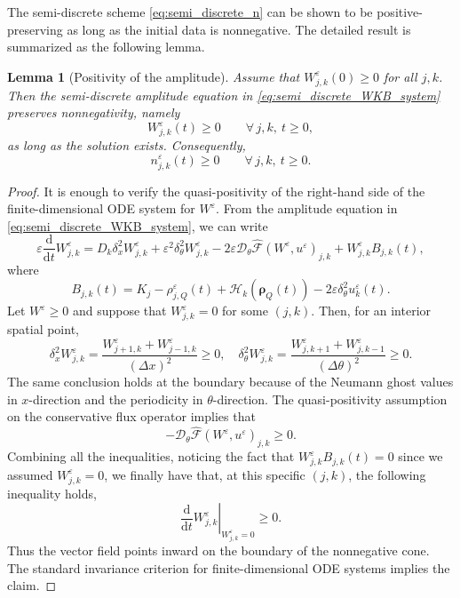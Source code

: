 \documentclass[11pt]{article}
\newtheorem{lemma}{Lemma}[section]
\begin{document}
The semi-discrete scheme \eqref{eq:semi_discrete_n} can be shown to be positive-preserving 
as long as the initial data is nonnegative. 
The detailed result is summarized as the following lemma. 

\begin{lemma}[Positivity of the amplitude]
\label{lem:positivity_W}
Assume that \(W_{j,k}^\varepsilon(0)\ge0\) for all \(j,k\). Then the
semi-discrete amplitude equation in \eqref{eq:semi_discrete_WKB_system}
preserves nonnegativity, namely
\[
    W_{j,k}^\varepsilon(t)\ge0
    \qquad
    \forall\,j,k,\ t\ge0,
\]
as long as the solution exists. Consequently,
\[
    n_{j,k}^\varepsilon(t)\ge0
    \qquad
    \forall\,j,k,\ t\ge0 .
\]
\end{lemma}

\begin{proof}
It is enough to verify the quasi-positivity of the right-hand side of the
finite-dimensional ODE system for \(W^\varepsilon\). From the amplitude
equation in \eqref{eq:semi_discrete_WKB_system}, we can write
\[
\varepsilon \frac{\mathrm d}{\mathrm dt}W_{j,k}^\varepsilon
=
D_k\delta_x^2W_{j,k}^\varepsilon
+
\varepsilon^2\delta_\theta^2W_{j,k}^\varepsilon
-
2\varepsilon
\mathcal D_\theta\widehat{\mathcal F}(W^\varepsilon,u^\varepsilon)_{j,k}
+
W_{j,k}^\varepsilon B_{j,k}(t),
\]
where
\[
B_{j,k}(t)
=
K_j-\rho_{j,Q}^\varepsilon(t)
+\mathcal H_k(\boldsymbol\rho_Q(t))
-2\varepsilon\delta_\theta^2u_k^\varepsilon(t).
\]
Let \(W^\varepsilon\ge0\) and suppose that
\(W_{j,k}^\varepsilon=0\) for some \((j,k)\). Then, for an interior spatial
point,
\[
\delta_x^2W_{j,k}^\varepsilon
=
\frac{W_{j+1,k}^\varepsilon+W_{j-1,k}^\varepsilon}{(\Delta x)^2}
\ge0, 
\quad 
\delta_\theta^2W_{j,k}^\varepsilon
=
\frac{W_{j,k+1}^\varepsilon+W_{j,k-1}^\varepsilon}{(\Delta\theta)^2}
\ge0 .
\]
The same conclusion holds at the boundary because of the Neumann ghost
values in $x$-direction and the periodicity in \(\theta\)-direction. 
The quasi-positivity assumption on the conservative flux operator implies that 
\[
    -
    \mathcal D_\theta\widehat{\mathcal F}(W^\varepsilon,u^\varepsilon)_{j,k}
    \ge0 .
\]
Combining all the inequalities, noticing the fact that 
\(
    W_{j,k}^\varepsilon B_{j,k}(t)=0 
\)
since we assumed $W_{j,k}^\varepsilon=0$, 
we finally have that, at this specific $(j,k)$, the following inequality holds, 
\[
\left.
\frac{\mathrm d}{\mathrm dt}W_{j,k}^\varepsilon
\right|_{W_{j,k}^\varepsilon=0}
\ge0 .
\]
Thus the vector field points inward on the boundary of the nonnegative cone.
The standard invariance criterion for finite-dimensional ODE systems implies
the claim.
\end{proof}
\end{document}
